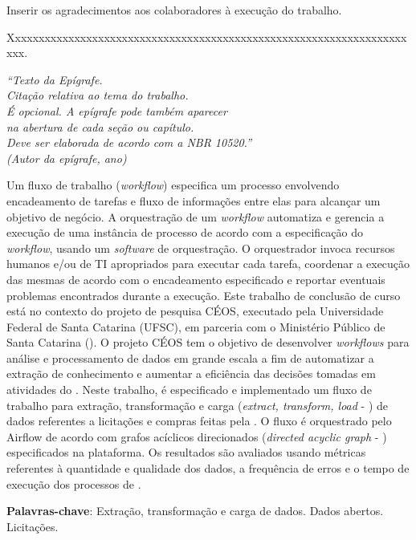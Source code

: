 \documentclass[
	12pt,				%
	oneside,			%
	a4paper,			%
	chapter=TITLE,		%
	section=TITLE,		%
	english,			%
	brazil				%
	]{abntex2}
\begin{document}
\begin{agradecimentos}
	Inserir os agradecimentos aos colaboradores à execução do trabalho. 
	
	Xxxxxxxxxxxxxxxxxxxxxxxxxxxxxxxxxxxxxxxxxxxxxxxxxxxxxxxxxxxxxxxxxxxxxx. 
\end{agradecimentos}

\begin{epigrafe}
	\vspace*{\fill}
	\begin{flushright}
		\textit{``Texto da Epígrafe.\\
			Citação relativa ao tema do trabalho.\\
			É opcional. A epígrafe pode também aparecer\\
			na abertura de cada seção ou capítulo.\\
			Deve ser elaborada de acordo com a NBR 10520.''\\
			(Autor da epígrafe, ano)}
	\end{flushright}
\end{epigrafe}


\setlength{\absparsep}{18pt} %
\begin{resumo}
	\SingleSpacing
Um fluxo de trabalho (\textit{workflow}) especifica um processo envolvendo encadeamento de tarefas e fluxo de informações entre elas para alcançar um objetivo de negócio. A orquestração de um \textit{workflow} automatiza e gerencia a execução de uma instância de processo de acordo com a especificação do \textit{workflow}, usando um \textit{software} de orquestração. O orquestrador invoca recursos humanos e/ou de TI apropriados para executar cada tarefa, coordenar a execução das mesmas de acordo com o encadeamento especificado e reportar eventuais problemas encontrados durante a execução. Este trabalho de conclusão de curso está no contexto do projeto de pesquisa CÉOS, executado pela Universidade Federal de Santa Catarina (UFSC), em parceria com o Ministério Público de Santa Catarina (). O projeto CÉOS tem o objetivo de desenvolver \textit{workflows} para análise e processamento de dados em grande escala a fim de automatizar a extração de conhecimento e aumentar a eficiência das decisões tomadas em atividades do . Neste trabalho, é especificado e implementado um fluxo de trabalho para extração, transformação e carga (\textit{extract, transform, load} - ) de dados referentes a licitações e compras feitas pela . O fluxo é orquestrado pelo Airflow de acordo com grafos acíclicos direcionados (\textit{directed acyclic graph} - ) especificados na plataforma. Os resultados são avaliados usando métricas referentes à quantidade e qualidade dos dados, a frequência de erros e o tempo de execução dos processos de .
	
	\textbf{Palavras-chave}: Extração, transformação e carga de dados. Dados abertos. Licitações.
\end{resumo}
\end{document}
